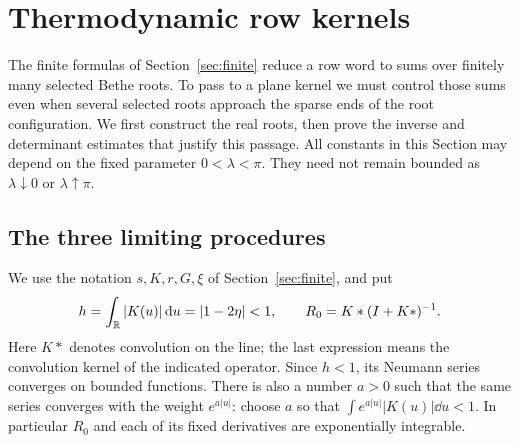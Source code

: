 \section{Thermodynamic row kernels}\label{sec:thermodynamic}

The finite formulas of Section~\ref{sec:finite} reduce a row word to
sums over finitely many selected Bethe roots.  To pass to a plane
kernel we must control those sums even when several selected roots
approach the sparse ends of the root configuration.  We first
construct the real roots, then prove the inverse and determinant
estimates that justify this passage.  All constants in this Section
may depend on the fixed parameter $0<\lambda<\pi$.  They need not
remain bounded as $\lambda\downarrow0$ or $\lambda\uparrow\pi$.

\subsection{The three limiting procedures}

We use the notation $s,K,r,G,\xi$ of Section~\ref{sec:finite}, and put
\[
 h=\int_{\mathbb R}|K(u)|\,\mathrm d u=|1-2\eta|<1,\qquad
 R_0=K*(I+K*)^{-1}.
\]
Here $K*$ denotes convolution on the line; the last expression means
the convolution kernel of the indicated operator.  Since $h<1$, its
Neumann series converges on bounded functions.  There is also a
number $a>0$ such that the same series converges with the weight
$e^{a|u|}$: choose $a$ so that
$\int e^{a|u|}|K(u)|\dd u<1$.  In particular $R_0$ and each of its
fixed derivatives are exponentially integrable.

